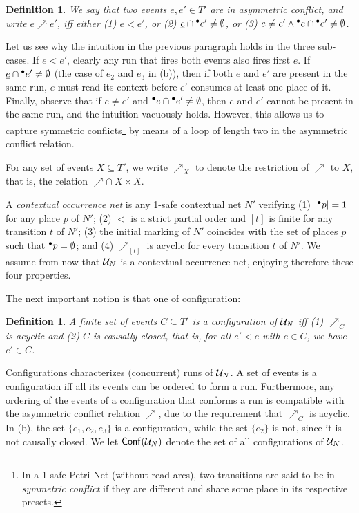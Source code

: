 \documentclass[11pt,a4paper]{article}
\newtheorem{definition}[theorem]{Definition}
\newcommand{\conf}[1]{\ensuremath{\mathsf{Conf}(#1)}}
\begin{document}
\begin{definition}
\label{def:asymmetric.conflict}
We say that two events $e, e' \in T'$ are in \emph{asymmetric conflict}, and
write $e \nearrow e'$, iff either (1) $e < e'$, or (2) $\underline{e} \cap {}^\bullet e'
\not= \emptyset$, or (3) $e \not= e' \land {}^\bullet e \cap {}^\bullet e' \not=
\emptyset$.
\end{definition}

Let us see why the intuition in the previous paragraph holds in the three
sub-cases.  If $e < e'$, clearly any run that fires both events also fires
first $e$.  If $\underline{e} \cap {}^\bullet e' \not = \emptyset$ (the case of $e_2$ and
$e_3$ in  (b)), then if both $e$ and $e'$ are present in the same
run, $e$ must read its context before $e'$ consumes at least one place of it.
Finally, observe that if $e \not = e'$ and ${}^\bullet e \cap {}^\bullet e' \not =
\emptyset$, then $e$ and $e'$ cannot be present in the same run, and the
intuition vacuously holds.  However, this allows us to capture symmetric
conflicts\footnote{In a 1-safe Petri Net (without read arcs), two transitions
are said to be in \emph{symmetric conflict} if they are different and share
some place in its respective presets.} by means of a loop of length two in the
asymmetric conflict relation.

For any set of events $X \subseteq T'$, we write $\nearrow_X$ to denote the
restriction of $\nearrow$ to $X$, that is, the relation $\nearrow \cap \ X
\times X$.

A \emph{contextual occurrence net} is any 1-safe contextual net $N'$ verifying
(1) $|{}^\bullet p| = 1$ for any place $p$ of $N'$; (2) $<$ is a strict partial order
and $[t]$ is finite for any transition $t$ of $N'$; (3) the initial marking of
$N'$ coincides with the set of places $p$ such that ${}^\bullet p = \emptyset$; and
(4) $\nearrow_{[t]}$ is acyclic for every transition $t$ of $N'$.  We assume
from now that $\mathcal{U}_{N}$ is a contextual occurrence net, enjoying therefore these
four properties.

The next important notion is that one of configuration:

\begin{definition}
A finite set of events $C \subseteq T'$ is a \emph{configuration} of $\mathcal{U}_{N}$
iff (1) $\nearrow_C$ is acyclic and (2) $C$ is causally closed, that is, for
all $e' < e$ with $e \in C$, we have $e' \in C$.
\end{definition}

Configurations characterizes (concurrent) runs of $\mathcal{U}_{N}$.  A set of events is
a configuration iff all its events can be ordered to form a run.  Furthermore,
any ordering of the events of a configuration that conforms a run is compatible
with the asymmetric conflict relation $\nearrow$, due to the requirement that
$\nearrow_C$ is acyclic.  In  (b), the set $\{e_1, e_2, e_3\}$ is
a configuration, while the set $\{e_2\}$ is not, since it is not causally
closed.  We let $\conf{\unf N}$ denote the set of all configurations of $\mathcal{U}_{N}$.
\end{document}
